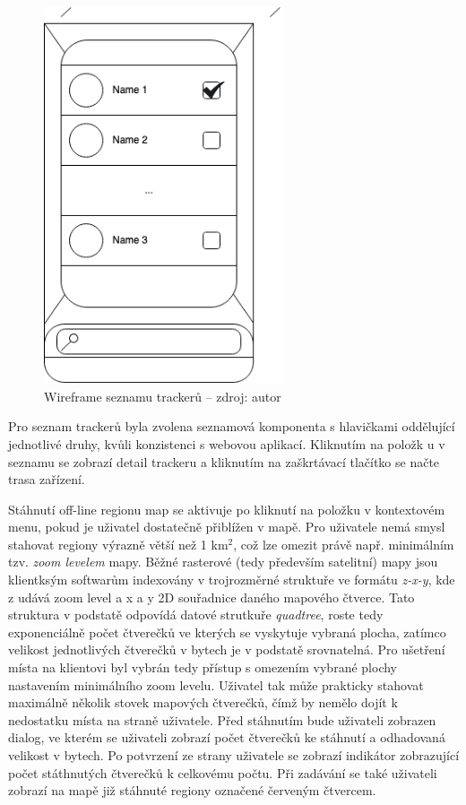 \begin{figure}[H]
	\begin{center}
		\includegraphics[width=70mm]{img/wf_list.png}
	\end{center}
	\caption[Wireframe seznamu trackerů]{Wireframe seznamu trackerů -- zdroj: autor}
\end{figure}

Pro seznam trackerů byla zvolena seznamová komponenta s hlavičkami oddělující jednotlivé druhy, kvůli konzistenci s webovou aplikací. Kliknutím na položk u v seznamu se zobrazí detail trackeru a kliknutím na zaškrtávací tlačítko se načte trasa zařízení.

Stáhnutí off-line regionu map se aktivuje po kliknutí na položku v kontextovém menu, pokud je uživatel dostatečně přiblížen v mapě. Pro uživatele nemá smysl stahovat regiony výrazně větší než 1 km$^2$, což lze omezit právě např. minimálním tzv. \emph{zoom levelem} mapy. Běžné rasterové (tedy především satelitní) mapy jsou klientksým softwarům indexovány v trojrozměrné struktuře ve formátu \emph{z-x-y}, kde z udává zoom level a x a y 2D souřadnice daného mapového čtverce. Tato struktura v podstatě odpovídá datové strutkuře \emph{quadtree}, roste tedy exponenciálně počet čtverečků ve kterých se vyskytuje vybraná plocha, zatímco velikost jednotlivých čtverečků v bytech je v podstatě srovnatelná. Pro ušetření místa na klientovi byl vybrán tedy přístup s omezením vybrané plochy nastavením minimálního zoom levelu. Uživatel tak může prakticky stahovat maximálně několik stovek mapových čtverečků, čímž by nemělo dojít k nedostatku místa na straně uživatele. Před stáhnutím bude uživateli zobrazen dialog, ve kterém se uživateli zobrazí počet čtverečků ke stáhnutí a odhadovaná velikost v bytech. Po potvrzení ze strany uživatele se zobrazí indikátor zobrazující počet státhnutých čtverečků k celkovému počtu. Při zadávání se také uživateli zobrazí na mapě již stáhnuté regiony označené červeným čtvercem.

